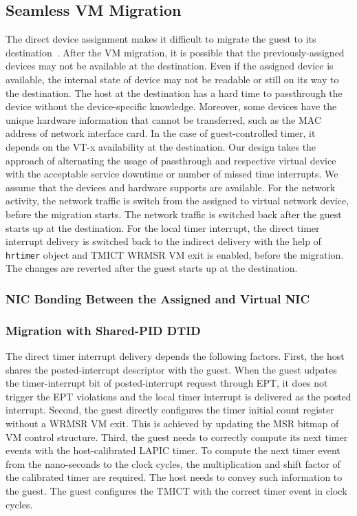 \subsection{Seamless VM Migration}
The direct device assignment makes it difficult to migrate the
guest to its destination~\cite{zhai:2008}. After the VM
migration, it is possible that the previously-assigned devices
may not be available at the destination. Even if the assigned
device is available, the internal state of device may not be
readable or still on its way to the destination. The host at
the destination has a hard time to passthrough the device
without the device-specific knowledge. Moreover, some devices
have the unique hardware information that cannot be
transferred, such as the MAC address of network interface
card. In the case of guest-controlled timer, it depends on the
VT-x availability at the destination. Our design takes the
approach of alternating the usage of passthrough and
respective virtual device with the acceptable service downtime
or number of missed time interrupts. We assume that the
devices and hardware supports are available. For the network
activity, the network traffic is switch from the assigned to
virtual network device, before the migration starts. The
network traffic is switched back after the guest starts up at
the destination. For the local timer interrupt, the direct
timer interrupt delivery is switched back to the indirect
delivery with the help of \texttt{hrtimer} object and TMICT
WRMSR VM exit is enabled, before the migration. The changes
are reverted after the guest starts up at the destination.

\subsubsection{NIC Bonding Between the Assigned and Virtual NIC}


\subsubsection{Migration with Shared-PID DTID}
The direct timer interrupt delivery depends the following
factors. First, the host shares the posted-interrupt
descriptor with the guest. When the guest udpates the
timer-interrupt bit of posted-interrupt request through EPT,
it does not trigger the EPT violations and the local timer
interrupt is delivered as the posted interrupt. Second, the
guest directly configures the timer initial count register
without a WRMSR VM exit. This is achieved by updating the MSR
bitmap of VM control structure. Third, the guest needs to
correctly compute its next timer events with the
host-calibrated LAPIC timer. To compute the next timer event
from the nano-seconds to the clock cycles, the multiplication
and shift factor of the calibrated timer are required. The
host needs to convey such information to the guest. The guest
configures the TMICT with the correct timer event in clock
cycles.

